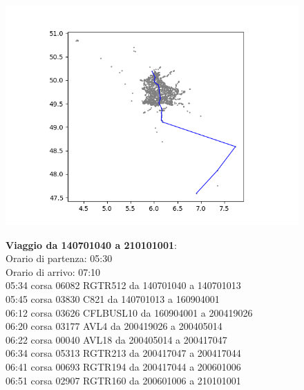 \documentclass{article}
\begin{document}
\begin{figure}[H]
	\begin{minipage}{0.55\linewidth}
		\centering
		\hspace*{-3cm}\includegraphics[width=1.0\linewidth, valign=t]{figures/Figure_1}
	\end{minipage}
	\hspace*{-2cm}\begin{minipage}{0.7\linewidth}
		\textbf{Viaggio da 140701040 a 210101001}:\\
		Orario di partenza: 05:30\\
		Orario di arrivo: 07:10\\
		05:34 corsa 06082 RGTR512 da 140701040 a 140701013\\
		05:45 corsa 03830 C821 da 140701013 a 160904001\\
		06:12 corsa 03626 CFLBUSL10 da 160904001 a 200419026\\
		06:20 corsa 03177 AVL4 da 200419026 a 200405014\\
		06:22 corsa 00040 AVL18 da 200405014 a 200417047\\
		06:34 corsa 05313 RGTR213 da 200417047 a 200417044\\
		06:41 corsa 00693 RGTR194 da 200417044 a 200601006\\
		06:51 corsa 02907 RGTR160 da 200601006 a 210101001
		
			\end{minipage}
\end{figure}
\end{document}
